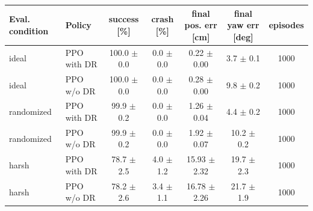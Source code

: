\begin{tabular}{llccccc}\toprule
Eval. condition & Policy & success [\%] & crash [\%] & final pos. err [cm] & final yaw err [deg] & episodes\\\midrule
ideal & PPO with DR & 100.0 $\pm$ 0.0 & 0.0 $\pm$ 0.0 & 0.22 $\pm$ 0.00 & 3.7 $\pm$ 0.1 & 1000\\
ideal & PPO w/o DR & 100.0 $\pm$ 0.0 & 0.0 $\pm$ 0.0 & 0.28 $\pm$ 0.00 & 9.8 $\pm$ 0.2 & 1000\\
\midrule
randomized & PPO with DR & 99.9 $\pm$ 0.2 & 0.0 $\pm$ 0.0 & 1.26 $\pm$ 0.04 & 4.4 $\pm$ 0.2 & 1000\\
randomized & PPO w/o DR & 99.9 $\pm$ 0.2 & 0.0 $\pm$ 0.0 & 1.92 $\pm$ 0.07 & 10.2 $\pm$ 0.2 & 1000\\
\midrule
harsh & PPO with DR & 78.7 $\pm$ 2.5 & 4.0 $\pm$ 1.2 & 15.93 $\pm$ 2.32 & 19.7 $\pm$ 2.3 & 1000\\
harsh & PPO w/o DR & 78.2 $\pm$ 2.6 & 3.4 $\pm$ 1.1 & 16.78 $\pm$ 2.26 & 21.7 $\pm$ 1.9 & 1000\\
\bottomrule\end{tabular}
